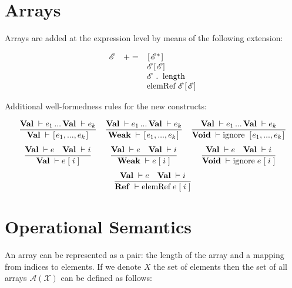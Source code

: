 \documentclass{article}
\author{Dmitry Boulytchev}
\newcommand{\trule}[2]{\dfrac{#1}{#2}}
\newcommand{\withenv}[2]{{#1}\vdash{#2}}
\newcommand{\llang}[1]{\mbox{\lstinline[mathescape]|#1|}}
\newcommand{\primi}[2]{\mathbf{#1}\;{#2}}
\theoremstyle{definition}
\begin{document}
\section{Arrays}

Arrays are added at the expression level by means of the following extension:

\[
\begin{array}{rcl}
  \mathscr E & += & \llang{[}\mathscr E^*\llang{]} \\
             &    & \mathscr E \llang{[$\mathscr E$]} \\
             &    & \mathscr E \;\llang{. length} \\
             &    & \llang{elemRef}\; \mathscr E\llang{[$\mathscr E$]}
\end{array}
\]

Additional well-formedness rules for the new constructs:

\ifdefined\Ref
  \renewcommand{\Ref}{\primi{Ref}{}}
\else 
  \newcommand{\Ref}{\primi{Ref}{}}
\fi
\newcommand{\Val}{\primi{Val}{}}
\newcommand{\Void}{\primi{Void}{}}
\newcommand{\Weak}{\primi{Weak}{}}

\[
\begin{array}{ccc}
  \trule{\withenv{\Val}{e_1}\,...\,\withenv{\Val}{e_k}}{\withenv{\Val}{\llang{[}e_1,...,e_k\llang{]}}} &
  \trule{\withenv{\Val}{e_1}\,...\,\withenv{\Val}{e_k}}{\withenv{\Weak}{\llang{[}e_1,...,e_k\llang{]}}} &
  \trule{\withenv{\Val}{e_1}\,...\,\withenv{\Val}{e_k}}{\withenv{\Void}{\llang{ignore [}e_1,...,e_k\llang{]}}} \\[5mm]
  \trule{\withenv{\Val}{e}\quad\withenv{\Val}{i}}{\withenv{\Val}{\llang{$e\;$[$\;i\;$]}}} &
  \trule{\withenv{\Val}{e}\quad\withenv{\Val}{i}}{\withenv{\Weak}{\llang{$e\;$[$\;i\;$]}}} &
  \trule{\withenv{\Val}{e}\quad\withenv{\Val}{i}}{\withenv{\Void}{\llang{ignore $\;e\;$[$\;i\;$]}}}\\[5mm]
  \multicolumn{3}{c}{\trule{\withenv{\Val}{e}\quad\withenv{\Val}{i}}{\withenv{\Ref}{\llang{elemRef $\;e\;$[$\;i\;$]}}}}
\end{array}
\]

\section{Operational Semantics}

An array can be represented as a pair: the length of the array and a mapping from indices to elements. If we denote
$X$ the set of elements then the set of all arrays $\mathscr A (\mathscr X)$ can be defined as follows:
\end{document}

